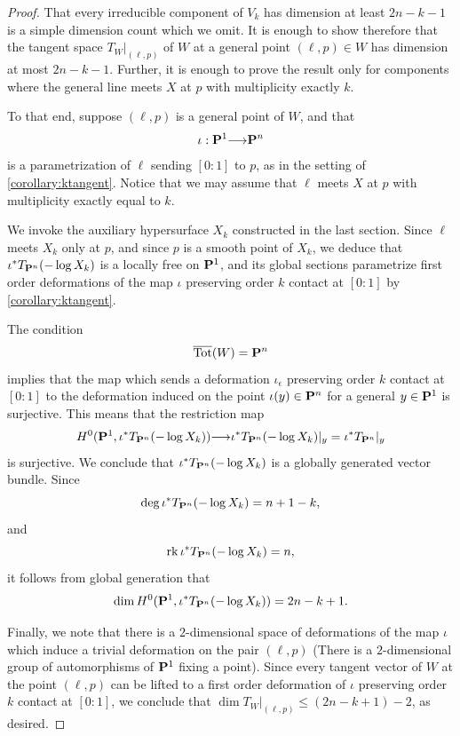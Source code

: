 \documentclass[12pt,reqno]{amsart}
\theoremstyle{plain}
\theoremstyle{remark}
\numberwithin{equation}{section}
\DeclareMathOperator{\Tot}{Tot}
\DeclareMathOperator{\dm}{dim}
\renewcommand{\to}{{\longrightarrow}}
\renewcommand {\P}{{\bf P}}
\providecommand{\rk}{\operatorname{rk}} \declaretheorem[sibling=theorem,style=plain]{remark}
\numberwithin{equation}{section}
\begin{document}
\begin{proof}
  That every irreducible component of $V_k$ has dimension at least
  $2n-k-1$ is a simple dimension count which we omit. It is
  enough to show therefore that the tangent space $T_{W}|_{(\ell,p)}$
  of $W$ at a general point $(\ell,p) \in W$ has dimension at most
  $2n-k-1$. Further, it is enough to prove the result only for components where the general line meets $X$ at $p$ with multiplicity exactly $k$.
  
  To that end, suppose $(\ell,p)$ is a general point of $W$, and that
  \[\iota: \P^{1} \to \P^{n}\] is a parametrization of $\ell$ sending
  $[0:1]$ to $p$, as in the setting of \autoref{corollary:ktangent}.
  Notice that we may assume that $\ell$ meets $X$ at $p$ with
  multiplicity exactly equal to $k$.

  We invoke the auxiliary hypersurface $X_k$ constructed in the last
  section.  Since $\ell$ meets $X_k$ only at $p$, and since $p$ is a
  smooth point of $X_k$, we deduce that
  $\iota^{*}T_{\P^{n}}(- \log X_{k})$ is a locally free on $\P^{1}$,
  and its global sections parametrize first order deformations of the
  map $\iota$ preserving order $k$ contact at $[0:1]$ by
  \autoref{corollary:ktangent}.

  The condition \[\overline{\Tot}(W) = \P^{n}\] implies that the map
  which sends a deformation $\iota_{\epsilon}$ preserving order $k$
  contact at $[0:1]$ to the deformation induced on the point
  $\iota(y) \in \P^{n}$ for a general $y \in \P^{1}$ is surjective.
  This means that the restriction map
\begin{align}
  \label{eq:restriction}
  H^{0}(\P^{1},\iota^{*}T_{\P^{n}}(- \log X_k)) \to \iota^{*}T_{\P^{n}}(- \log X_k)|_{y} = \iota^{*}T_{\P^{n}}|_{y}
\end{align}
is surjective.  We conclude that $\iota^{*}T_{\P^{n}}(- \log X_{k})$
is a globally generated vector bundle.  Since
\[\deg \iota^{*}T_{\P^{n}}(- \log X_{k}) = n+1-k,\] and
\[\rk \iota^{*}T_{\P^{n}}(- \log X_{k}) = n,\] it follows from global
generation that
\[\dm H^{0}(\P^{1},\iota^{*}T_{\P^{n}}(- \log X_{k}))=2n-k+1.\]

Finally, we note that there is a $2$-dimensional space of deformations
of the map $\iota$ which induce a trivial deformation on the pair
$(\ell, p)$ (There is a $2$-dimensional group of automorphisms of
$\P^{1}$ fixing a point).  Since every tangent vector of $W$ at the
point $(\ell, p)$ can be lifted to a first order deformation of
$\iota$ preserving order $k$ contact at $[0:1]$, we conclude that
$\dm T_{W}|_{(\ell,p)} \leq (2n-k+1)-2$, as desired.
\end{proof}
\end{document}
